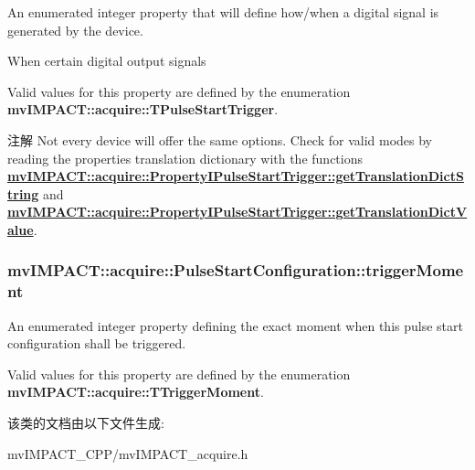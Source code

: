 An enumerated integer property that will define how/when a digital signal is generated by the device. 

When certain digital output signals

Valid values for this property are defined by the enumeration {\bfseries mv\+I\+M\+P\+A\+C\+T\+::acquire\+::\+T\+Pulse\+Start\+Trigger}.

\begin{DoxyNote}{注解}
Not every device will offer the same options. Check for valid modes by reading the properties translation dictionary with the functions {\bfseries \hyperlink{classmv_i_m_p_a_c_t_1_1acquire_1_1_enum_property_i_af5ec5a9c3657af2917f4ead78ef067db}{mv\+I\+M\+P\+A\+C\+T\+::acquire\+::\+Property\+I\+Pulse\+Start\+Trigger\+::get\+Translation\+Dict\+String}} and {\bfseries \hyperlink{classmv_i_m_p_a_c_t_1_1acquire_1_1_enum_property_i_a0c50700ebff2806621c63d03b624f200}{mv\+I\+M\+P\+A\+C\+T\+::acquire\+::\+Property\+I\+Pulse\+Start\+Trigger\+::get\+Translation\+Dict\+Value}}. 
\end{DoxyNote}
\hypertarget{classmv_i_m_p_a_c_t_1_1acquire_1_1_pulse_start_configuration_ae8ac8d12618f23cbb2e0fa73d011373d}{
\subsubsection[{trigger\+Moment}]{ mv\+I\+M\+P\+A\+C\+T\+::acquire\+::\+Pulse\+Start\+Configuration\+::trigger\+Moment}}\label{classmv_i_m_p_a_c_t_1_1acquire_1_1_pulse_start_configuration_ae8ac8d12618f23cbb2e0fa73d011373d}


An enumerated integer property defining the exact moment when this pulse start configuration shall be triggered. 

Valid values for this property are defined by the enumeration {\bfseries mv\+I\+M\+P\+A\+C\+T\+::acquire\+::\+T\+Trigger\+Moment}. 

该类的文档由以下文件生成\+:\begin{DoxyCompactItemize}
\item 
mv\+I\+M\+P\+A\+C\+T\+\_\+\+C\+P\+P/mv\+I\+M\+P\+A\+C\+T\+\_\+acquire.\+h\end{DoxyCompactItemize}
